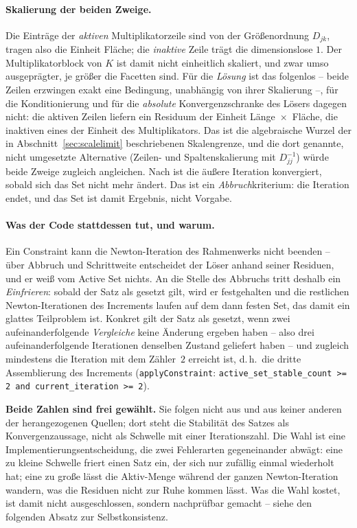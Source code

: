 \documentclass[a4paper,11pt]{article}
\def\bm#1{#1}%
\def\tilde#1{#1}%
\newcommand{\code}[1]{\texttt{\small #1}}
\begin{document}
\paragraph{Skalierung der beiden Zweige.} Die Einträge der \emph{aktiven} Multiplikatorzeile sind
von der Größenordnung $D_{jk}$, tragen also die Einheit Fläche; die \emph{inaktive} Zeile trägt die
dimensionslose $1$. Der Multiplikatorblock von $\bm K$ ist damit nicht einheitlich skaliert, und
zwar umso ausgeprägter, je größer die Facetten sind. Für die \emph{Lösung} ist das folgenlos --
beide Zeilen erzwingen exakt eine Bedingung, unabhängig von ihrer Skalierung --, für die
Konditionierung und für die \emph{absolute} Konvergenzschranke des Lösers dagegen nicht: die
aktiven Zeilen liefern ein Residuum der Einheit Länge~$\times$~Fläche, die inaktiven eines der
Einheit des Multiplikators. Das ist die algebraische Wurzel der in
Abschnitt~\ref{sec:scalelimit} beschriebenen Skalengrenze, und die dort genannte, nicht umgesetzte
Alternative (Zeilen- und Spaltenskalierung mit $\tilde D_{jj}^{-1}$) würde beide Zweige zugleich
angleichen.
Nach \citet{hueber2005} ist die äußere Iteration konvergiert, sobald sich das Set nicht mehr
ändert. Das ist ein \emph{Abbruch}kriterium: die Iteration endet, und das Set ist damit Ergebnis,
nicht Vorgabe.

\paragraph{Was der Code stattdessen tut, und warum.}
Ein Constraint kann die Newton-Iteration des Rahmenwerks nicht beenden -- über Abbruch und
Schrittweite entscheidet der Löser anhand seiner Residuen, und er weiß vom Active Set nichts. An
die Stelle des Abbruchs tritt deshalb ein \emph{Einfrieren}: sobald der Satz als gesetzt gilt,
wird er festgehalten und die restlichen Newton-Iterationen des Increments laufen auf dem dann
festen Set, das damit ein glattes Teilproblem ist. Konkret gilt der Satz als gesetzt, wenn zwei
aufeinanderfolgende \emph{Vergleiche} keine Änderung ergeben haben -- also drei aufeinanderfolgende
Iterationen denselben Zustand geliefert haben -- und zugleich mindestens die Iteration mit dem
Zähler~$2$ erreicht ist, d.\,h.\ die dritte Assemblierung des Increments
(\code{applyConstraint}: \code{active\_set\_stable\_count >= 2 and current\_iteration >= 2}).

\medskip
\noindent\textbf{Beide Zahlen sind frei gewählt.} Sie folgen nicht aus \citet{hueber2005} und aus
keiner anderen der herangezogenen Quellen; dort steht die Stabilität des Satzes als
Konvergenzaussage, nicht als Schwelle mit einer Iterationszahl. Die Wahl ist eine
Implementierungsentscheidung, die zwei Fehlerarten gegeneinander abwägt: eine zu kleine Schwelle
friert einen Satz ein, der sich nur zufällig einmal wiederholt hat; eine zu große lässt die
Aktiv-Menge während der ganzen Newton-Iteration wandern, was die Residuen nicht zur Ruhe kommen
lässt. Was die Wahl kostet, ist damit nicht ausgeschlossen, sondern nachprüfbar gemacht -- siehe
den folgenden Absatz zur Selbstkonsistenz.
\end{document}
